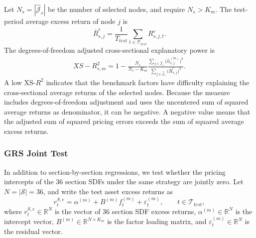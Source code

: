 \documentclass[12pt]{article}
\def\bm#1{#1}%
\def\mathrm#1{#1}%
\def\text#1{#1}%
\begin{document}
Let \(N_s=|\widehat{\mathcal J}_s|\) be the number of selected nodes, and require \(N_s>K_m\). The test-period average excess return of node \(j\) is
\begin{equation}
  \overline R_{s,j}^{e}
  =
  \frac{1}{T_{\mathrm{test}}}
  \sum_{t\in\mathcal T_{\mathrm{test}}}
  R_{s,j,t}^{e}.
  \label{eq:node_mean_excess_return}
\end{equation}
The degrees-of-freedom adjusted cross-sectional explanatory power is
\begin{equation}
  \begin{aligned}
  \mathrm{XS}\text{-}R_{s,m}^{2}
  =1-
  \frac{N_s}{N_s-K_m}
  \frac{
    \displaystyle
    \sum_{j\in\widehat{\mathcal J}_s}
    \bigl(\widehat\alpha_{s,j}^{(m)}\bigr)^2
  }{
    \displaystyle
    \sum_{j\in\widehat{\mathcal J}_s}
    \bigl(\overline R_{s,j}^{e}\bigr)^2
  }.
  \end{aligned}
  \label{eq:xs_r2}
\end{equation}
A low XS-\(R^2\) indicates that the benchmark factors have difficulty explaining the cross-sectional average returns of the selected nodes. Because the measure includes degrees-of-freedom adjustment and uses the uncentered sum of squared average returns as denominator, it can be negative. A negative value means that the adjusted sum of squared pricing errors exceeds the sum of squared average excess returns.

\subsubsection{GRS Joint Test}

In addition to section-by-section regressions, we test whether the pricing intercepts of the 36 section SDFs under the same strategy are jointly zero. Let \(N=|\mathcal S|=36\), and write the test asset excess returns as
\begin{equation}
  \bm r_t^{S,e}
  =
  \bm\alpha^{(m)}
  +\bm B^{(m)}\bm f_t^{(m)}
  +\bm\varepsilon_t^{(m)},
  \qquad
  t\in\mathcal T_{\mathrm{test}},
  \label{eq:grs_system}
\end{equation}
where \(\bm r_t^{S,e}\in\mathbb R^N\) is the vector of 36 section SDF excess returns, \(\bm\alpha^{(m)}\in\mathbb R^N\) is the intercept vector, \(\bm B^{(m)}\in\mathbb R^{N\times K_m}\) is the factor loading matrix, and \(\bm\varepsilon_t^{(m)}\in\mathbb R^N\) is the residual vector.
\end{document}
